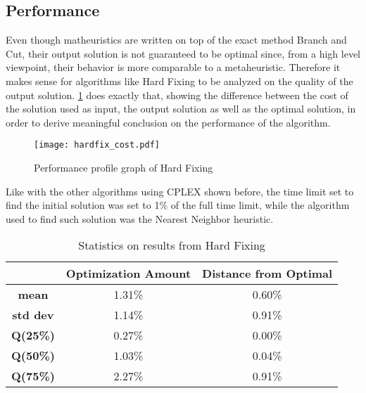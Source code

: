 \subsection{Performance}

Even though matheuristics are written on top of the exact method Branch and Cut, their output solution is not guaranteed to be optimal since, from a high level viewpoint, their behavior is more comparable to a metaheuristic.
Therefore it makes sense for algorithms like Hard Fixing to be analyzed on the quality of the output solution.
\figurename{ \ref{fig:hardfixCost}} does exactly that, showing the difference between the cost of the solution used as input, the output solution as well as the optimal solution, in order to derive meaningful conclusion on the performance of the algorithm.
\begin{figure}[htbp]
	\centering
	\texttt{[image: hardfix\_cost.pdf]}
	\caption{Performance profile graph of Hard Fixing\label{fig:hardfixCost}}
\end{figure}
Like with the other algorithms using CPLEX shown before, the time limit set to find the initial solution was set to 1\% of the full time limit, while the algorithm used to find such solution was the Nearest Neighbor heuristic.
\begin{table}[htbp]
	\centering
	\begin{tabular}{c|c|c|}
        & \textbf{Optimization Amount} & \textbf{Distance from Optimal} \\
		\hline \textbf{mean} & 1.31\% & 0.60\% \\
		\hline \textbf{std dev} & 1.14\% & 0.91\% \\
        \hline \textbf{Q(25\%)} & 0.27\% & 0.00\% \\
        \hline \textbf{Q(50\%)} & 1.03\% & 0.04\% \\
        \hline \textbf{Q(75\%)} & 2.27\% & 0.91\% \\
	\end{tabular}
    \vspace{2mm}
	\caption{Statistics on results from Hard Fixing} \label{tab:hardfixStats}
\end{table}

